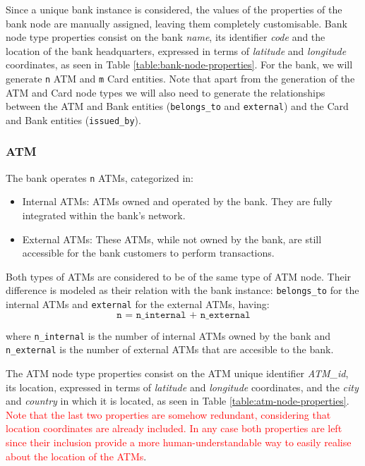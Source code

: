 \documentclass{article}
\begin{document}
Since a unique bank instance is considered, the values of the properties of the bank node are 
manually assigned, leaving them completely customisable. Bank node type properties consist
on the bank \emph{name}, its identifier \emph{code} and the location
of the bank headquarters, expressed in terms of \emph{latitude} and \emph{longitude}
coordinates, as seen in Table \ref{table:bank-node-properties}.
For the bank, we will generate \texttt{n} ATM and \texttt{m} Card entities. Note that 
apart from the generation of the ATM and Card node types we will also need to generate 
the relationships between the ATM and Bank entities (\texttt{belongs\_to} and \texttt{external}) 
and the Card and Bank entities (\texttt{issued\_by}).



\subsubsection*{ATM}



The bank operates \texttt{n} ATMs, categorized in:

\begin{itemize}
  \item Internal ATMs: ATMs owned and operated by the bank. They are fully integrated within the
  bank's network. 
  \item External ATMs: These ATMs, while not owned by the bank, are still accessible for the bank
  customers to perform transactions.
\end{itemize}

Both types of ATMs are considered to be of the same type of ATM node. Their difference
is modeled as their relation with the bank instance: \texttt{belongs\_to} for the internal ATMs and \texttt{external} for the external ATMs, having:
$$\texttt{n = n\_internal + n\_external}$$

where \texttt{n\_internal} is the number of internal ATMs owned by the bank and \texttt{n\_external}
is the number of external ATMs that are accesible to the bank.


The ATM node type properties consist on the ATM unique identifier \emph{ATM\_id}, its location, expressed in terms of 
\emph{latitude} and \emph{longitude} coordinates, and the \emph{city} and 
\emph{country} in which it is located, as seen in Table \ref{table:atm-node-properties}.
\textcolor{red}{Note that the last two properties are somehow redundant, considering
that location coordinates are already included. In any case both properties are left
since their inclusion provide a more human-understandable way to easily realise about
the location of the ATMs}.
\end{document}
